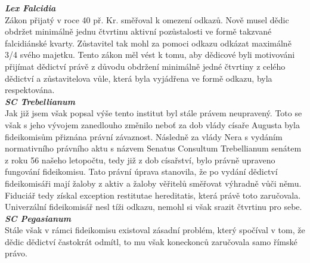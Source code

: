 \documentclass{article}
\begin{document}
\noindent\textbf{\textit{Lex Falcidia}}\\

Zákon přijatý v roce 40 př. Kr. směřoval k omezení odkazů. Nově musel dědic obdržet minimálně jednu čtvrtinu aktivní pozůstalosti ve formě takzvané falcidiánské kvarty. Zůstavitel tak mohl za pomoci odkazu odkázat maximálně 3/4 svého majetku. Tento zákon měl vést k tomu, aby dědicové byli motivováni přijímat dědictví právě z důvodu obdržení minimálně jedné čtvrtiny z celého dědictví a zůstavitelova vůle, která byla vyjádřena ve formě odkazu, byla respektována.\\

\noindent\textbf{\textit{SC Trebellianum}}\\

Jak již jsem však popsal výše tento institut byl stále právem neupravený. Toto se však s jeho vývojem zanedlouho změnilo neboť za dob vlády císaře Augusta byla fideikomisům přiznána právní závaznost. Následně za vlády Nera s vydáním normativního právního aktu s názvem Senatus Consultum Trebe\-llianum senátem z roku 56 našeho letopočtu, tedy již z dob císařství, bylo právně upraveno fungování fideikomisu. Tato právní úprava stanovila, že po vydání dědictví fideikomisáři mají žaloby z aktiv a žaloby věřitelů směřovat výhradně vůči němu. Fiduciář tedy získal exception restitutae hereditatis, která právě toto zaručovala. Univerzální fideikomisář nesl tíži odkazu, nemohl si však srazit čtvrtinu pro sebe.\\ 

\noindent\textbf{\textit{SC Pegasianum}}\\


Stále však v rámci fideikomisu existoval zásadní problém, který spočíval v tom, že dědic dědictví častokrát odmítl, to mu však koneckonců zaručovala samo římské právo.\\ 
\end{document}
